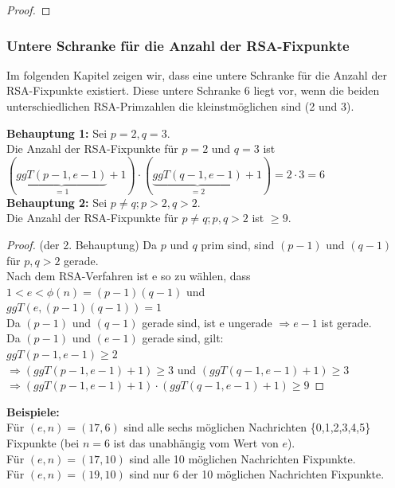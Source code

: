 \begin{refsegment}
\begin{proof}{}
\end{proof}
\vspace{15pt}



\subsubsection{Untere Schranke für die Anzahl der RSA-Fixpunkte}
Im folgenden Kapitel zeigen wir, dass eine untere Schranke für die Anzahl der RSA-Fixpunkte
existiert. Diese untere Schranke $6$ liegt vor, wenn die beiden unterschiedlichen
RSA-Primzahlen die kleinstmöglichen sind (2 und 3).

\noindent\textbf{Behauptung 1:} Sei $p = 2, q = 3$.\\
Die Anzahl der RSA-Fixpunkte für $p=2$ und $q=3$ ist\\
$(\underbrace{ggT(p-1, e-1)}_{=1}+1) \cdot (\underbrace{ggT(q-1, e-1)}_{=2}+1)=2 \cdot 3=6$\\

\noindent\textbf{Behauptung 2:} Sei $p \neq q; p > 2,q > 2$.\\
Die Anzahl der RSA-Fixpunkte für $p \neq q; p,q > 2$ ist $\geq 9$.

\begin{proof}{(der 2. Behauptung)}
Da $p$ und $q$ prim sind, sind $(p-1)$ und $(q-1)$ für $ p,q > 2 $ gerade.\\
Nach dem RSA-Verfahren ist e so zu wählen, dass $1 < e < \phi(n)=(p-1)(q-1)$ und\\
$ggT(e,(p-1)(q-1))=1$\\
Da $(p-1)$ und $(q-1)$ gerade sind, ist e ungerade $ \Rightarrow e-1$ ist gerade.\\
Da $(p-1)$ und $(e-1)$ gerade sind, gilt:\\
$ggT(p-1, e-1) \geq 2$\\
$\Rightarrow (ggT(p-1, e-1)+1) \geq 3$ und $(ggT(q-1, e-1)+1) \geq 3$\\
$\Rightarrow (ggT(p-1, e-1)+1) \cdot (ggT(q-1, e-1)+1) \geq 9$
\end{proof}

\vspace{\baselineskip}
\noindent \textbf{Beispiele:}\\
Für $(e,n)=(17,6)$ sind alle sechs möglichen Nachrichten \{0,1,2,3,4,5\} Fixpunkte (bei $n=6$ ist das unabhängig vom Wert von $e$).\\
Für $(e,n)=(17,10)$ sind alle 10 möglichen Nachrichten Fixpunkte.\\
Für $(e,n)=(19,10)$ sind nur 6 der 10 möglichen Nachrichten Fixpunkte.




\end{refsegment}
